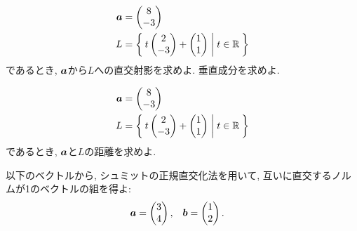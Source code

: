 \begin{quiz}
  \label{quiz:5:p:2}
  \begin{align*}
    \boldsymbol{a}&=\begin{pmatrix}8\\-3\end{pmatrix}\\
    L&=\Set{t\begin{pmatrix}2\\-3\end{pmatrix}+\begin{pmatrix}1\\1\end{pmatrix}|t\in\mathbb{R}}
  \end{align*}
  であるとき,
$\boldsymbol{a}$から$L$への直交射影を求めよ.
垂直成分を求めよ.
\end{quiz}


\begin{quiz}
  \label{quiz:5:p:3}
  \begin{align*}
    \boldsymbol{a}&=\begin{pmatrix}8\\-3\end{pmatrix}\\
    L&=\Set{t\begin{pmatrix}2\\-3\end{pmatrix}+\begin{pmatrix}1\\1\end{pmatrix}|t\in\mathbb{R}}
  \end{align*}
  であるとき,
$\boldsymbol{a}$と$L$の距離を求めよ.
\end{quiz}

\begin{quiz}
  以下のベクトルから, シュミットの正規直交化法を用いて,
  互いに直交するノルムが1のベクトルの組を得よ:
  \begin{align*}
    \boldsymbol{a}&=\begin{pmatrix}3\\4\end{pmatrix},&
    \boldsymbol{b}&=\begin{pmatrix}1\\2\end{pmatrix}.
  \end{align*}
\end{quiz}


